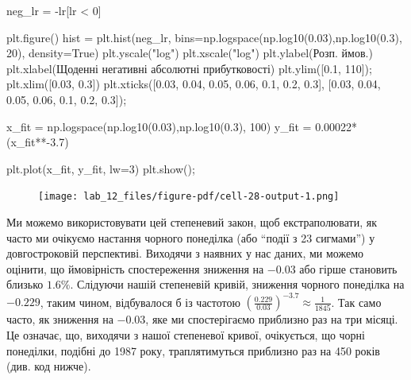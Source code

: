 \documentclass[
  letterpaper,
]{report}
\newenvironment{Shaded}{\begin{snugshade}}{\end{snugshade}}
\newcommand{\DecValTok}[1]{\textcolor[rgb]{0.68,0.00,0.00}{#1}}
\newcommand{\FloatTok}[1]{\textcolor[rgb]{0.68,0.00,0.00}{#1}}
\newcommand{\NormalTok}[1]{\textcolor[rgb]{0.00,0.23,0.31}{#1}}
\newcommand{\OperatorTok}[1]{\textcolor[rgb]{0.37,0.37,0.37}{#1}}
\newcommand{\StringTok}[1]{\textcolor[rgb]{0.13,0.47,0.30}{#1}}
\newcommand{\VariableTok}[1]{\textcolor[rgb]{0.07,0.07,0.07}{#1}}
\begin{document}
\begin{Shaded}
\begin{Highlighting}[]
\NormalTok{neg\_lr }\OperatorTok{=} \OperatorTok{{-}}\NormalTok{lr[lr }\OperatorTok{\textless{}} \DecValTok{0}\NormalTok{]}

\NormalTok{plt.figure()}
\NormalTok{hist }\OperatorTok{=}\NormalTok{ plt.hist(neg\_lr, bins}\OperatorTok{=}\NormalTok{np.logspace(np.log10(}\FloatTok{0.03}\NormalTok{),np.log10(}\FloatTok{0.3}\NormalTok{), }\DecValTok{20}\NormalTok{), density}\OperatorTok{=}\VariableTok{True}\NormalTok{)}
\NormalTok{plt.yscale(}\StringTok{"log"}\NormalTok{)}
\NormalTok{plt.xscale(}\StringTok{"log"}\NormalTok{)}
\NormalTok{plt.ylabel(}\StringTok{\textquotesingle{}Розп. ймов.\textquotesingle{}}\NormalTok{)}
\NormalTok{plt.xlabel(}\StringTok{\textquotesingle{}Щоденні негативні абсолютні прибутковості\textquotesingle{}}\NormalTok{)}
\NormalTok{plt.ylim([}\FloatTok{0.1}\NormalTok{, }\DecValTok{110}\NormalTok{])}\OperatorTok{;}
\NormalTok{plt.xlim([}\FloatTok{0.03}\NormalTok{, }\FloatTok{0.3}\NormalTok{])}
\NormalTok{plt.xticks([}\FloatTok{0.03}\NormalTok{, }\FloatTok{0.04}\NormalTok{, }\FloatTok{0.05}\NormalTok{, }\FloatTok{0.06}\NormalTok{, }\FloatTok{0.1}\NormalTok{, }\FloatTok{0.2}\NormalTok{, }\FloatTok{0.3}\NormalTok{], [}\FloatTok{0.03}\NormalTok{, }\FloatTok{0.04}\NormalTok{, }\FloatTok{0.05}\NormalTok{, }\FloatTok{0.06}\NormalTok{, }\FloatTok{0.1}\NormalTok{, }\FloatTok{0.2}\NormalTok{, }\FloatTok{0.3}\NormalTok{])}\OperatorTok{;}

\NormalTok{x\_fit }\OperatorTok{=}\NormalTok{ np.logspace(np.log10(}\FloatTok{0.03}\NormalTok{),np.log10(}\FloatTok{0.3}\NormalTok{), }\DecValTok{100}\NormalTok{)}
\NormalTok{y\_fit }\OperatorTok{=} \FloatTok{0.00022}\OperatorTok{*}\NormalTok{(x\_fit}\OperatorTok{**{-}}\FloatTok{3.7}\NormalTok{)}

\NormalTok{plt.plot(x\_fit, y\_fit, lw}\OperatorTok{=}\DecValTok{3}\NormalTok{)}
\NormalTok{plt.show()}\OperatorTok{;}
\end{Highlighting}
\end{Shaded}

\begin{figure}[H]

{\centering \texttt{[image: lab\_12\_files/figure-pdf/cell-28-output-1.png]}

}

\end{figure}

Ми можемо використовувати цей степеневий закон, щоб екстраполювати, як
часто ми очікуємо настання чорного понеділка (або ``події з 23
сигмами'') у довгостроковій перспективі. Виходячи з наявних у нас даних,
ми можемо оцінити, що ймовірність спостереження зниження на \(-0.03\)
або гірше становить близько \(1.6\%\). Слідуючи нашій степеневій кривій,
зниження чорного понеділка на \(-0.229\), таким чином, відбувалося б із
частотою
\(\left(\frac{0.229}{0.03}\right)^{-3.7} \approx \frac{1}{1845}\). Так
само часто, як зниження на \(-0.03\), яке ми спостерігаємо приблизно раз
на три місяці. Це означає, що, виходячи з нашої степеневої кривої,
очікується, що чорні понеділки, подібні до 1987 року, траплятимуться
приблизно раз на 450 років (див. код нижче).
\end{document}

